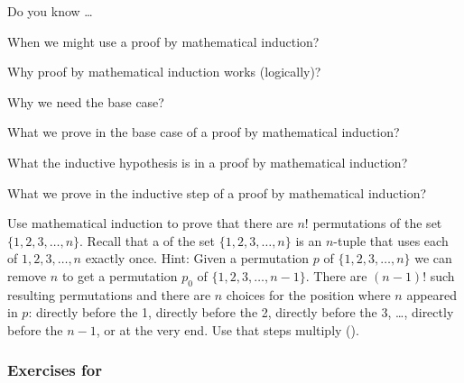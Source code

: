 \begin{exer}[\exerR] %
\label{exer_dyk_pff_math_induction}
    Do you know \ldots
        \begin{exerpart}
            \item When we might use a proof by mathematical induction?
            \item Why proof by mathematical induction works (logically)?
            \item Why we need the base case?
            \item What we prove in the base case of a proof by mathematical induction?
            \item What the inductive hypothesis is in a proof by mathematical induction?
            \item What we prove in the inductive step of a proof by mathematical induction?
        \end{exerpart}
\end{exer}

 \begin{exer}[\exerE] %
\label{exer_math_ind_number_perms}
    Use mathematical induction to prove that there are $n!$ permutations of the set $\{1,2,3,\ldots,n\}$.  Recall that a  of the set $\{1,2,3,\ldots,n\}$ is an $n$-tuple that uses each of $1,2,3,\ldots,n$ exactly once.  Hint: Given a permutation $p$ of $\{1,2,3,\ldots,n\}$ we can remove $n$ to get a permutation $p_0$ of $\{1,2,3,\ldots,n-1\}$.  There are $(n-1)!$ such resulting permutations and there are $n$ choices for the position where $n$ appeared in $p$: directly before the 1, directly before the 2, directly before the 3, \ldots, directly before the $n-1$, or at the very end.  Use that steps multiply ().
\end{exer}


\subsubsection*{Exercises for  \subalgind}

